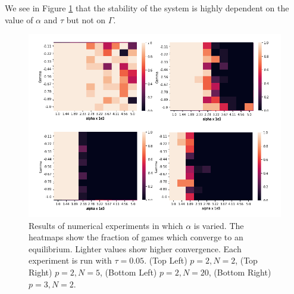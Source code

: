 \documentclass[sigconf,anonymous]{aamas}
\begin{document}
We see in Figure \ref{fig:NumericalExperiments} that the stability of the system is highly dependent on
the value of $\alpha$ and $\tau$ but not on $\Gamma$.
   
\begin{figure}[t]
    \includegraphics[width = 1.2 \linewidth, center]{Figures/Experiments.png}
    \caption{Results of numerical experiments in which $\alpha$ is varied. The heatmaps show the fraction of games which converge to an equilibrium. Lighter values show higher convergence. Each experiment is run with $\tau = 0.05$. (Top Left) $p = 2, N = 2$, (Top Right) $p = 2, N = 5$, (Bottom Left) $p = 2, N = 20$, (Bottom Right) $p=3, N = 2$.}
    \label{fig:NumericalExperiments}
\end{figure}
\end{document}
